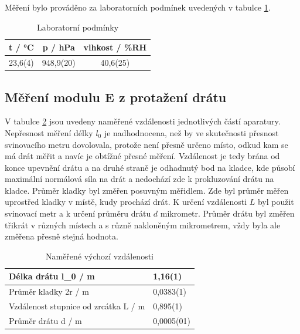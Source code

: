     Měření bylo prováděno za laboratorních podmínek uvedených v tabulce \ref{tab:lab_pod}.

    \begin{table}[h]
        \centering
        \begin{tabular}{|c|c|c|} 
        \hline
            t / °C & p / hPa & vlhkost / \%RH  \\ 
        \hline
            23,6(4)   & 948,9(20)   & 40,6(25)            \\
        \hline
        \end{tabular}
        \caption{Laboratorní podmínky}
        \label{tab:lab_pod}
    \end{table}

\newpage

\subsection{Měření modulu E z protažení drátu}

V tabulce \ref{tab:vychozi-vzdalenosti} jsou uvedeny naměřené vzdálenosti jednotlivých částí aparatury. Nepřesnost měření délky \(l_0\) je nadhodnocena, než by ve skutečnosti přesnost svinovacího metru dovolovala, protože není přesně určeno místo, odkud kam se má drát měřit a navíc je obtížné přesné měření. Vzdálenost je tedy brána od konce upevnění drátu a na druhé straně je odhadnutý bod na kladce, kde působí maximální normálová síla na drát a nedochází zde k prokluzování drátu na kladce. Průměr kladky byl změřen posuvným měřidlem. Zde byl průměr měřen uprostřed kladky v místě, kudy prochází drát. K určení vzdálenosti \(L\) byl použit svinovací metr a k určení průměru drátu \(d\) mikrometr. Průměr drátu byl změřen třikrát v různých místech a s různě nakloněným mikrometrem, vždy byla ale změřena přesně stejná hodnota.

\begin{table}[h]
\centering
\begin{tabular}{|l|l|}
\hline
Délka drátu l_0 / m                 & 1,16(1)   \\ \hline
Průměr kladky 2r / m                 & 0,0383(1) \\ \hline
Vzdálenost stupnice od zrcátka L / m & 0,895(1)  \\ \hline
Průměr drátu d / m                   & 0,0005(01) \\ \hline
\end{tabular}
\caption{Naměřené výchozí vzdálenosti}
\label{tab:vychozi-vzdalenosti}
\end{table}

